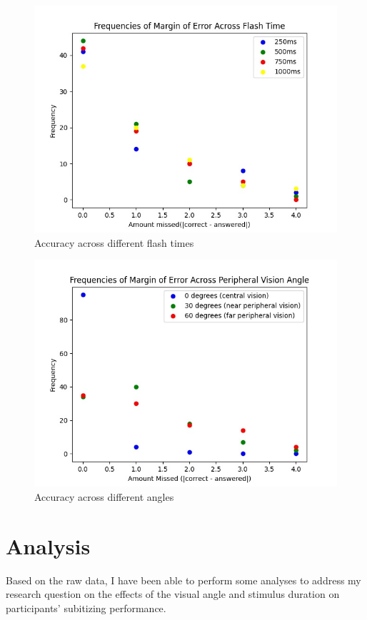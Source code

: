 \documentclass[12pt]{article}
\begin{document}
\begin{figure} [p]
\centering
\includegraphics[scale=0.4]{reaction.jpg}
\caption{Accuracy across different flash times}
\end{figure}

\begin{figure} [p]
\centering
\includegraphics[scale=0.4]{angle.jpg}
\caption{Accuracy across different angles}
\end{figure}

\newpage
\section{Analysis}

Based on the raw data, I have been able to perform some analyses to address my
research question on the effects of the visual angle and stimulus duration on
participants’ subitizing performance. 
\end{document}
